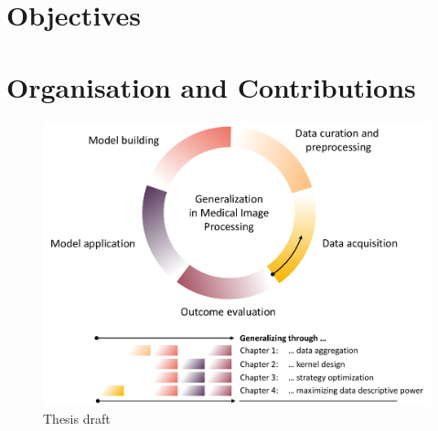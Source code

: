 








\section{Objectives} %


\section{Organisation and Contributions}  %

    \begin{figure}
        \label{fig:draft}
        \includegraphics[width=\textwidth]{sections/01_introduction/figures/draft.pdf}
        \caption{Thesis draft}

    \end{figure}